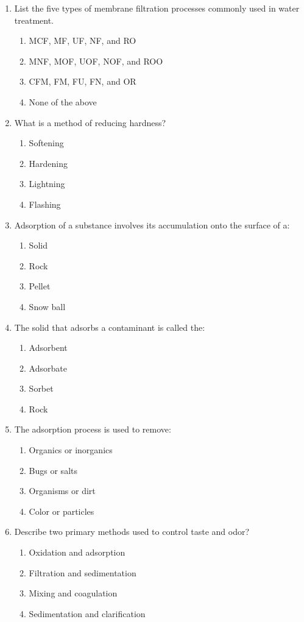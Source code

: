 \begin{enumerate}
\item List the five types of membrane filtration processes commonly used in water
treatment.
\begin{enumerate}
\item MCF, MF, UF, NF, and RO
\item MNF, MOF, UOF, NOF, and ROO
\item CFM, FM, FU, FN, and OR
\item None of the above
\end{enumerate}

\item What is a method of reducing hardness?
\begin{enumerate}
\item Softening
\item Hardening
\item Lightning
\item Flashing
\end{enumerate}

\item Adsorption of a substance involves its accumulation onto the surface of a:
\begin{enumerate}
\item Solid
\item Rock
\item Pellet
\item Snow ball
\end{enumerate}

\item The solid that adsorbs a contaminant is called the:
\begin{enumerate}
\item Adsorbent
\item Adsorbate
\item Sorbet
\item Rock
\end{enumerate}

\item The adsorption process is used to remove:
\begin{enumerate}
\item Organics or inorganics
\item Bugs or salts
\item Organisms or dirt
\item Color or particles
\end{enumerate}

\item Describe two primary methods used to control taste and odor?
\begin{enumerate}
\item Oxidation and adsorption
\item Filtration and sedimentation
\item Mixing and coagulation
\item Sedimentation and clarification
\end{enumerate}




\end{enumerate}
